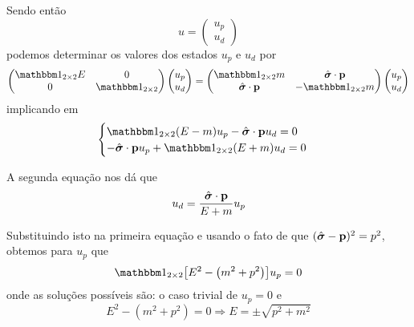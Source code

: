     Sendo então
        \begin{equation*}
            u = \begin{pmatrix}
                u_{p} \\ u_{d}
            \end{pmatrix}
        \end{equation*}
    podemos determinar os valores dos estados $u_{p}$ e $u_{d}$ por
        \begin{equation*}
            \begin{pmatrix}
                \boldone_{2\times 2}E & 0 \\
                0 & \boldone_{2\times 2}
            \end{pmatrix}
            \begin{pmatrix}
                u_{p} \\ u_{d}
            \end{pmatrix} = 
            \begin{pmatrix}
                \boldone_{2\times 2}m & \hat{\boldsymbol{\sigma}}\cdot\vb{p} \\
                \hat{\boldsymbol{\sigma}}\cdot\vb{p} & -\boldone_{2\times 2}m
            \end{pmatrix}
            \begin{pmatrix}
                u_{p} \\ u_{d}
            \end{pmatrix}
        \end{equation*}
    implicando em 
        \begin{equation*}
            \begin{cases}
                \boldone_{2\times 2}(E - m)u_{p} - \hat{\boldsymbol{\sigma}}\cdot \vb{p} u_{d} = 0 \\
                -\hat{\boldsymbol{\sigma}}\cdot\vb{p}u_{p} + \boldone_{2\times 2}(E + m)u_{d} = 0
            \end{cases}
        \end{equation*}

    A segunda equação nos dá que
        \begin{equation}\label{eq: equation for ud}
            u_{d} = \dfrac{\hat{\boldsymbol{\sigma}}\cdot\vb{p}}{E+m}u_{p}
        \end{equation}

    Substituindo isto na primeira equação e usando o fato de que $(\hat{\boldsymbol{\sigma}} - \vb{p})^{2} = p^{2}$, obtemos para $u_{p}$ que
        \begin{equation*}
            \boldone_{2\times 2}\qty[E^{2} - \qty(m^{2} + p^{2})]u_{p} = 0
        \end{equation*}
    onde as soluções possíveis são: o caso trivial de $u_{p} = 0$ e 
        \begin{equation*}
            E^{2} - (m^{2} + p^{2}) = 0 \Rightarrow E = \pm \sqrt{p^{2} + m^{2}}
        \end{equation*}

